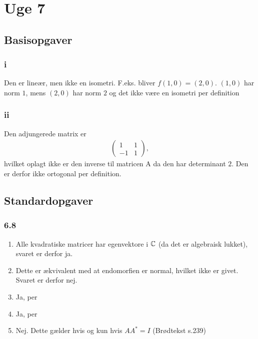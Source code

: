 
\chapter{Uge 7}

	\section{Basisopgaver}

		\subsection{i}

			Den er lineær, men ikke en isometri. F.eks. bliver $f(1,0)=(2,0)$. $(1,0)$ har norm $1$, mens $(2,0)$ har norm $2$ og det ikke være en isometri per definition

		\subsection{ii}

			Den adjungerede matrix er
				\begin{align*}
						\left(\begin{array}{rrrr} 1 & 1 \\ -1 & 1 \end{array}\right),
				\end{align*} 
			hvilket oplagt ikke er den inverse til matricen A da den har determinant $2$. Den er derfor ikke ortogonal per definition.

	\section{Standardopgaver}

		\subsection{6.8}

			\begin{enumerate}
				\item Alle kvadratiske matricer har egenvektore i $\mathbb{C}$ (da det er algebraisk lukket), svaret er derfor ja.
				\item Dette er ækvivalent med at endomorfien er normal, hvilket ikke er givet. Svaret er derfor nej.
				\item Ja, per \cite[Korollar 6.2.11]{hesselholt2017}
				\item Ja, per \cite[Korollar 6.2.11]{hesselholt2017}
				\item Nej. Dette gælder hvis og kun hvis $AA^{*}=I$ (Brødtekst s.239)
			\end{enumerate}


